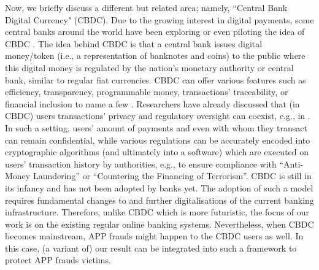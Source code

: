 Now, we briefly discuss a different but related area; namely, ``Central Bank Digital Currency" (CBDC). Due to the growing interest in digital payments, some central banks around the world have been exploring or even piloting the idea of CBDC \cite{CBDC}.  The idea behind CBDC is that a central bank issues digital money/token (i.e., a representation of banknotes and coins) to the public where this digital money is regulated by the nation's monetary authority or central bank, similar to regular fiat currencies. CBDC can offer various features such as efficiency, transparency, programmable money, transactions' traceability, or financial inclusion to name a few \cite{CBDC,CBDC-core-features}. Researchers have already discussed that (in CBDC) users transactions' privacy and regulatory oversight can coexist, e.g., in \cite{abs-2103-00254,WustKCC19}. In such a setting, users' amount of payments and even with whom they transact can remain confidential, while  various regulations can be accurately encoded  into cryptographic algorithms (and ultimately into a software) which are executed on users' transaction history by  authorities, e.g., to ensure compliance with ``Anti-Money Laundering'' or ``Countering the Financing of Terrorism''.  CBDC is still in its infancy and has not been adopted by banks yet. The adoption of such a model requires fundamental changes to and further digitalisations of the current banking  infrastructure. Therefore, unlike CBDC which is more futuristic, the focus of our work is on the existing regular  online banking systems.  Nevertheless, when CBDC becomes mainstream, APP frauds  might happen to the CBDC users as well. In this case, (a variant of) our result can be integrated into  such a framework to protect  APP frauds victims.  





